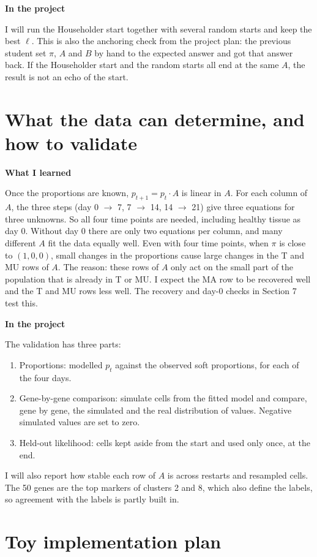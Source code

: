 \documentclass[10pt,a4paper]{article}
\newcommand{\sub}[1]{\vspace{1pt}\textbf{\textcolor{gray!80!black}{#1}}\par}
\begin{document}
\sub{In the project}
I will run the Householder start together with several random starts and keep the best $\ell$. This is also the anchoring check from the project plan: the previous student set $\pi$, $A$ and $B$ by hand to the expected answer and got that answer back. If the Householder start and the random starts all end at the same $A$, the result is not an echo of the start.

\section{What the data can determine, and how to validate}

\sub{What I learned}
Once the proportions are known, $p_{t+1} = p_t \cdot A$ is linear in $A$. For each column of $A$, the three steps (day 0 $\to$ 7, 7 $\to$ 14, 14 $\to$ 21) give three equations for three unknowns. So all four time points are needed, including healthy tissue as day 0. Without day 0 there are only two equations per column, and many different $A$ fit the data equally well. Even with four time points, when $\pi$ is close to $(1,0,0)$, small changes in the proportions cause large changes in the T and MU rows of $A$. The reason: these rows of $A$ only act on the small part of the population that is already in T or MU. I expect the MA row to be recovered well and the T and MU rows less well. The recovery and day-0 checks in Section 7 test this.

\sub{In the project}
The validation has three parts:
\begin{enumerate}
  \item Proportions: modelled $p_t$ against the observed soft proportions, for each of the four days.
  \item Gene-by-gene comparison: simulate cells from the fitted model and compare, gene by gene, the simulated and the real distribution of values. Negative simulated values are set to zero.
  \item Held-out likelihood: cells kept aside from the start and used only once, at the end.
\end{enumerate}
I will also report how stable each row of $A$ is across restarts and resampled cells. The 50 genes are the top markers of clusters 2 and 8, which also define the labels, so agreement with the labels is partly built in.

\newpage
\section{Toy implementation plan}
\end{document}
